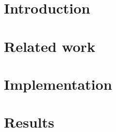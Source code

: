\documentclass[a4paper,12pt,oneside,openany]{book}
\begin{document}
\frontmatter
\thispagestyle{empty}



\pagebreak            



     \tableofcontents
\listoffigures
\listoftables

\mainmatter
\cleardoublepage
\chapter{Introduction}
\label{cap1}


\chapter{Related work}
\label{cap2}


\chapter{Implementation}
\label{cap3}


\chapter{Results}
\label{cap4}


\end{document}
